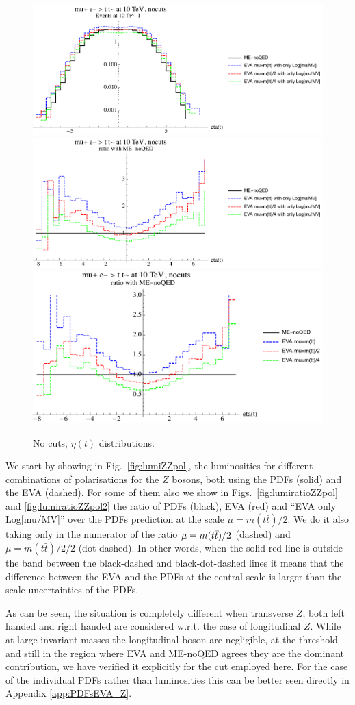 \documentclass[a4paper,11pt]{article}
\begin{document}
\begin{figure}[!t]
\includegraphics[width=0.46\linewidth]{Notebooks/PlotDistr/ZZ_tt/10TeVnocuts/plotetat.pdf}
\includegraphics[width=0.46\linewidth]{Notebooks/PlotDistr/ZZ_tt/10TeVnocuts/plotetatratio1.pdf}
\includegraphics[width=0.46\linewidth]{Notebooks/PlotDistr/ZZ_tt/10TeVnocuts/plotetatratio2.pdf}
\caption{No cuts, $\eta(t)$ distributions. \label{fig:nocutsZZtt2}}
\end{figure}




We start by showing in Fig.~\ref{fig:lumiZZpol}, the luminosities for different combinations of polarisations for the $Z$ bosons, both using the PDFs (solid) and the EVA (dashed). For some of them also we show in Figs.~\ref{fig:lumiratioZZpol} and \ref{fig:lumiratioZZpol2} the ratio of PDFs (black), EVA (red) and ``EVA only Log[mu/MV]'' over the PDFs prediction at the scale $\mu=m(t \bar t) /2$. We do it also taking only in the numerator of the ratio  $\mu=m(t \bar t) /2 \time 2$ (dashed) and $\mu=m(t \bar t) /2 / 2$ (dot-dashed). In other words, when the solid-red line is outside the band between the black-dashed and black-dot-dashed lines it means that the difference between the EVA and the PDFs at the central scale is larger than the scale uncertainties of the PDFs.

As can be seen, the situation is completely different when transverse $Z$, both left handed and right handed  are considered w.r.t. the case of longitudinal $Z$. While at large invariant masses the longitudinal boson are negligible, at the threshold and still in the region where EVA and ME-noQED agrees they are the dominant contribution, we have verified it explicitly for the cut employed here. For the case of the individual PDFs rather than luminosities this can be better seen directly in Appendix \ref{app:PDFsEVA_Z}.
\end{document}
